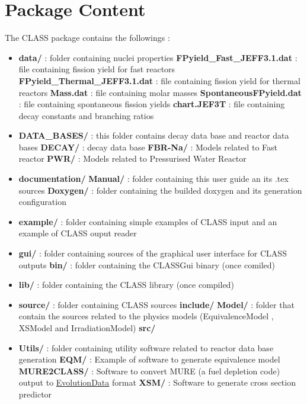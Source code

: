 \chapter{Package Content}
The CLASS package contains the followings :
\begin{itemize}
\item   \textbf{data/} : folder containing nuclei properties
\subitem \textbf{FPyield\_Fast\_JEFF3.1.dat }     : file containing fission yield for fast reactors
\subitem \textbf{FPyield\_Thermal\_JEFF3.1.dat}   : file containing fission yield for thermal reactors
\subitem \textbf{Mass.dat }                     : file containing molar masses
\subitem \textbf{SpontaneousFPyield.dat }       : file containing spontaneous fission yields
\subitem \textbf{chart.JEF3T}                   : file containing decay constants and branching ratios

 \item \textbf{DATA\_BASES/}  : this folder contains decay data base and reactor data bases
 \subitem \textbf{DECAY/}     : decay data base
 \subitem \textbf{FBR-Na/}    : Models related to Fast reactor
 \subitem \textbf{PWR/}       : Models related to Pressurised Water Reactor
 
 \item \textbf{documentation/} 
 \subitem \textbf{Manual/}    : folder containing this user guide an its .tex sources
 \subitem \textbf{Doxygen/}   : folder containing the builded doxygen and its generation configuration 

\item \textbf{example/} : folder containing simple examples of CLASS input and an example of CLASS ouput reader

\item \textbf{gui/} : folder containing sources of the graphical user interface for CLASS outputs
 \subitem \textbf{bin/}    : folder containing the CLASSGui binary (once comiled)

\item \textbf{lib/} : folder containing the CLASS library (once compiled)
\item \textbf{source/} : folder containing CLASS sources
\subitem \textbf{include/}
\subitem \textbf{Model/} : folder that contain the sources related to the physics models (EquivalenceModel , XSModel and IrradiationModel)
\subitem \textbf{src/}
\item \textbf{Utils/} : folder containing utility software related to reactor data base generation
\subitem \textbf{EQM/} : Example of software to generate equivalence model
\subitem \textbf{MURE2CLASS/} : Software to convert MURE (a fuel depletion code)  output to \hyperref[sec:EvolutionData]{EvolutionData} format
\subitem \textbf{XSM/} : Software to generate cross section predictor
 
 
\end{itemize}

